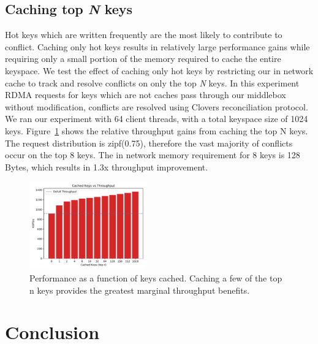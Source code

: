 \subsection{Caching top \textit{N} keys} 
Hot keys which are written frequently are the most likely to
contribute to conflict. Caching only hot keys results in relatively
large performance gains while requiring only a small portion of the
memory required to cache the entire keyspace. We test the effect of
caching only hot keys by restricting our in network cache to track and
resolve conflicts on only the top \textit{N} keys. In this experiment
RDMA requests for keys which are not caches pass through our middlebox
without modification, conflicts are resolved using Clovers
reconciliation protocol. We ran our experiment with 64 client threads,
with a total keyspace size of 1024 keys. Figure~\ref{fig:cache} shows
the relative throughput gains from caching the top N keys. The request
distribution is zipf(0.75), therefore the vast majority of conflicts
occur on the top 8 keys. The in network memory requirement for 8 keys
is 128 Bytes, which results in 1.3x throughput improvement.

\begin{figure}
    \includegraphics[width=0.45\textwidth]{fig/cache.pdf}
    \caption{Performance as a function of keys cached. Caching a few
    of the top n keys provides the greatest marginal throughput
    benefits.}
    \label{fig:cache}
\end{figure}

\section{Conclusion}









